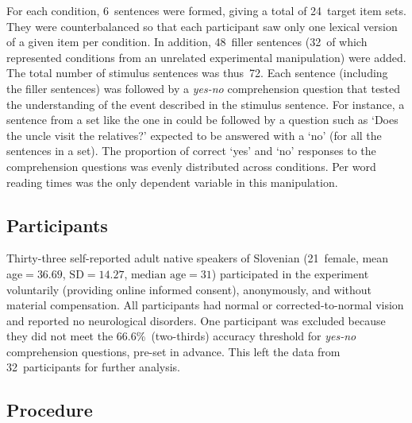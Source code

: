 \documentclass[output=paper,colorlinks,citecolor=brown]{langscibook}
\begin{document}
\noindent For each condition, 6~sentences were formed, giving a total of 24~target item sets. They were counterbalanced so that each participant saw only one lexical version of a given item per condition. In addition, 48~filler sentences (32~of which represented conditions from an unrelated experimental manipulation) were added. The total number of stimulus sentences was thus~72. Each sentence (including the filler sentences) was followed by a \textit{yes-no} comprehension question that tested the understanding of the event described in the stimulus sentence. For instance, a sentence from a set like the one in  could be followed by a question such as ‘Does the uncle visit the relatives?’ expected to be answered with a ‘no’ (for all the sentences in a set). The proportion of correct ‘yes’ and ‘no’ responses to the comprehension questions was evenly distributed across conditions. Per word reading times was the only dependent variable in this manipulation.

\subsection{Participants}\label{ste-pav:sec:participants}

Thirty-three self-reported adult native speakers of Slovenian (21~female,  mean age${}=36.69$, $\text{SD}=14.27$, $\text{median age}=31$) participated in the experiment voluntarily (providing online informed consent), anonymously, and without material compensation. All participants had normal or corrected-to-normal vision and reported no neurological disorders. One participant was excluded because they did not meet the 66.6\%~(two-thirds) accuracy threshold for \textit{yes-no} comprehension questions, pre-set in advance. This left the data from 32~participants for further analysis.

\subsection{Procedure}\label{ste-pav:sec:procedure}\largerpage
\end{document}
